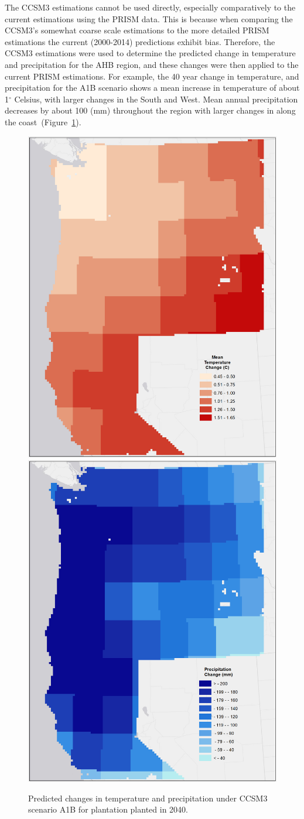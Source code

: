 \documentclass[preprint,12pt]{elsarticle}
\newcommand{\degree}{\ensuremath{{}^{\circ}}\xspace}
\begin{document}
The \ac{CCSM3} estimations cannot be used directly, especially
comparatively to the current estimations using the \ac{PRISM} data.
This is because when comparing the \ac{CCSM3}'s somewhat coarse scale
estimations to the more detailed \ac{PRISM} estimations the current
(2000-2014) predictions exhibit bias.  Therefore, the \ac{CCSM3}
estimations were used to determine the predicted change in temperature
and precipitation for the \ac {AHB} region, and these changes were
then applied to the current \ac{PRISM} estimations. For example, the
40 year change in temperature, and precipitation for the A1B scenario
shows a mean increase in temperature of about 1\degree Celsius, with
larger changes in the South and West.  Mean annual precipitation
decreases by about 100 (mm) throughout the region with larger changes
in along the coast~(Figure~\ref{fig:change}).

\begin{figure}[hp]
  \centering
  \includegraphics[width=0.45\linewidth]{temp_change}
  \includegraphics[width=0.45\linewidth]{precip_change.png}
  \caption{Predicted changes in temperature and precipitation under \ac{CCSM3} scenario A1B for plantation planted in 2040.}
  \label{fig:change}
\end{figure}
\end{document}
